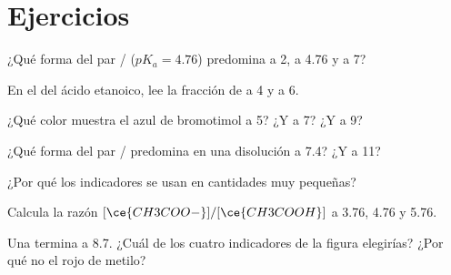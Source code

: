 \section{Ejercicios}


\begin{exercise}[$\star$]\label{exo:g12:buffers-predominance:1}
¿Qué forma del par / ($pK_a = 4.76$) predomina a
 2, a  4.76 y a  7?
\end{exercise}

\begin{exercise}[$\star$]\label{exo:g12:buffers-predominance:2}
En el  del ácido etanoico, lee la fracción de
 a  4 y a  6.
\end{exercise}

\begin{exercise}[$\star$]\label{exo:g12:buffers-predominance:3}
¿Qué color muestra el azul de bromotimol a  5? ¿Y a  7? ¿Y a  9?
\end{exercise}

\begin{exercise}[$\star$]\label{exo:g12:buffers-predominance:4}
¿Qué forma del par / predomina en una disolución a
 7.4? ¿Y a  11?
\end{exercise}

\begin{exercise}[$\star$]\label{exo:g12:buffers-predominance:5}
¿Por qué los indicadores se usan en cantidades muy pequeñas?
\end{exercise}

\begin{exercise}[$\star\star$]\label{exo:g12:buffers-predominance:6}
Calcula la razón $[\ce{CH3COO-}]/[\ce{CH3COOH}]$ a  3.76, 4.76 y 5.76.
\end{exercise}

\begin{exercise}[$\star\star$]\label{exo:g12:buffers-predominance:7}
Una  termina a  8.7. ¿Cuál de los cuatro indicadores de la
figura elegirías? ¿Por qué no el rojo de metilo?
\end{exercise}

